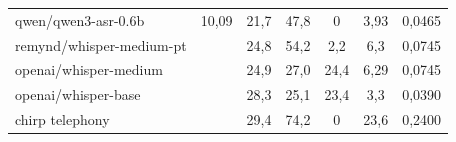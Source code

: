 \documentclass{IEEEphot}
\begin{document}
\begin{table}[t]
\begin{tabular}{lcccccc}
\multicolumn{1}{|l|}{qwen/qwen3-asr-0.6b}                      & \multicolumn{1}{c|}{10,09}                                                                                                            & \multicolumn{1}{c|}{21,7}                            & \multicolumn{1}{c|}{47,8}                                                                        & \multicolumn{1}{c|}{0}                                                                  & \multicolumn{1}{c|}{3,93}                             & \multicolumn{1}{c|}{0,0465}                              \\
\multicolumn{1}{|l|}{remynd/whisper-medium-pt}                 & \multicolumn{1}{c|}{}                                                                                                                 & \multicolumn{1}{c|}{24,8}                            & \multicolumn{1}{c|}{54,2}                                                                        & \multicolumn{1}{c|}{2,2}                                                                & \multicolumn{1}{c|}{6,3}                              & \multicolumn{1}{c|}{0,0745}                              \\
\multicolumn{1}{|l|}{openai/whisper-medium}                    & \multicolumn{1}{c|}{}                                                                                                                 & \multicolumn{1}{c|}{24,9}                            & \multicolumn{1}{c|}{27,0}                                                                        & \multicolumn{1}{c|}{24,4}                                                               & \multicolumn{1}{c|}{6,29}                             & \multicolumn{1}{c|}{0,0745}                              \\
\multicolumn{1}{|l|}{openai/whisper-base}                      & \multicolumn{1}{c|}{}                                                                                                                 & \multicolumn{1}{c|}{28,3}                            & \multicolumn{1}{c|}{25,1}                                                                        & \multicolumn{1}{c|}{23,4}                                                               & \multicolumn{1}{c|}{3,3}                              & \multicolumn{1}{c|}{0,0390}                              \\
\multicolumn{1}{|l|}{chirp telephony}                          & \multicolumn{1}{c|}{}                                                                                                                 & \multicolumn{1}{c|}{29,4}                            & \multicolumn{1}{c|}{74,2}                                                                        & \multicolumn{1}{c|}{0}                                                                  & \multicolumn{1}{c|}{23,6}                             & \multicolumn{1}{c|}{0,2400}                              \\

\end{tabular}
\end{table}
\end{document}
